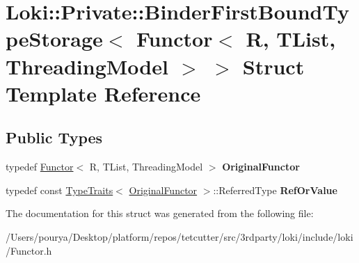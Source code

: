 \hypertarget{structLoki_1_1Private_1_1BinderFirstBoundTypeStorage_3_01Functor_3_01R_00_01TList_00_01ThreadingModel_01_4_01_4}{}\section{Loki\+:\+:Private\+:\+:Binder\+First\+Bound\+Type\+Storage$<$ Functor$<$ R, T\+List, Threading\+Model $>$ $>$ Struct Template Reference}
\label{structLoki_1_1Private_1_1BinderFirstBoundTypeStorage_3_01Functor_3_01R_00_01TList_00_01ThreadingModel_01_4_01_4}
\subsection*{Public Types}
\begin{DoxyCompactItemize}
\item 
\hypertarget{structLoki_1_1Private_1_1BinderFirstBoundTypeStorage_3_01Functor_3_01R_00_01TList_00_01ThreadingModel_01_4_01_4_a9f95e5194baf09a56b08d390fdba751b}{}typedef \hyperlink{classLoki_1_1Functor}{Functor}$<$ R, T\+List, Threading\+Model $>$ {\bfseries Original\+Functor}\label{structLoki_1_1Private_1_1BinderFirstBoundTypeStorage_3_01Functor_3_01R_00_01TList_00_01ThreadingModel_01_4_01_4_a9f95e5194baf09a56b08d390fdba751b}

\item 
\hypertarget{structLoki_1_1Private_1_1BinderFirstBoundTypeStorage_3_01Functor_3_01R_00_01TList_00_01ThreadingModel_01_4_01_4_a5fa892f46fc20972e960d9a65f81b34c}{}typedef const \hyperlink{classLoki_1_1TypeTraits}{Type\+Traits}$<$ \hyperlink{classLoki_1_1Functor}{Original\+Functor} $>$\+::Referred\+Type {\bfseries Ref\+Or\+Value}\label{structLoki_1_1Private_1_1BinderFirstBoundTypeStorage_3_01Functor_3_01R_00_01TList_00_01ThreadingModel_01_4_01_4_a5fa892f46fc20972e960d9a65f81b34c}

\end{DoxyCompactItemize}


The documentation for this struct was generated from the following file\+:\begin{DoxyCompactItemize}
\item 
/\+Users/pourya/\+Desktop/platform/repos/tetcutter/src/3rdparty/loki/include/loki/Functor.\+h\end{DoxyCompactItemize}
